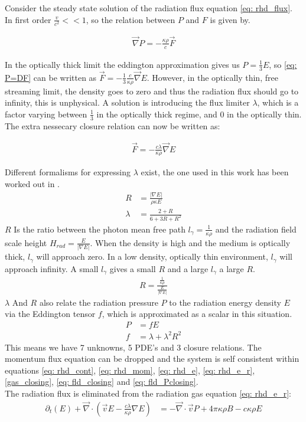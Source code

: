 Consider the steady state solution of the radiation flux equation \eqref{eq: rhd_flux}. In first order $\frac{v}{c^2} << 1$, so the relation between $P$ and $F$ is given by.

\begin{align}
\vec{\nabla} P = - \frac{\kappa \rho}{c} \vec{F} \label{eq: P=DF}
\end{align}

In the optically thick limit the eddington approximation gives us $P = \frac{1}{3}E$, so \eqref{eq: P=DF} can be written as $\vec{F} = -\frac{1}{3}\frac{c}{\kappa \rho} \vec{\nabla}E$. However, in the optically thin, free streaming limit, the density goes to zero and thus the radiation flux should go to infinity, this is unphysical. A solution is introducing the flux limiter $\lambda$, which is a factor varying between $\frac{1}{3}$ in the optically thick regime, and $0$ in the optically thin. The extra nessecary closure relation can now be written as:

\begin{align}
\vec{F} = -\frac{c\lambda}{\kappa \rho} \vec{\nabla}E \label{eq: fld_closing}
\end{align}

Different formalisms for expressing $\lambda$ exist, the one used in this work has been worked out in \cite{Levermore1981}. 
\begin{align}
R &= \frac{|\nabla E|}{\rho \kappa E} \\
\lambda &= \frac{2 + R}{6 + 3R + R^2} 
\end{align}
$R$ Is the ratio between the photon mean free path $l_\gamma = \frac{1}{\kappa \rho}$ and the radiation field scale height $H_{rad} = \frac{E}{\left| \nabla E \right|}$. When the density is high and the medium is optically thick, $l_\gamma$ will approach zero. In a low density, optically thin environment, $l_\gamma$ will approach infinity. A small $l_\gamma$ gives a small $R$ and a large $l_\gamma$ a large $R$.
\begin{align*}
R = \frac{\frac{1}{\kappa \rho}}{\frac{E}{\left| \nabla E \right|}}
\end{align*}
$\lambda$ And $R$ also relate the radiation pressure $P$ to the radiation energy density $E$ via the Eddington tensor $f$, which is approximated as a scalar in this situation.
\begin{align}
P &= f E  \label{eq: fld_Pclosing} \\
f &= \lambda + \lambda^2 R^2
\end{align}
This means we have 7 unknowns, 5 PDE's and 3 closure relations. The momentum flux equation can be dropped and the system is self consistent within equations \eqref{eq: rhd_cont}, \eqref{eq: rhd_mom}, \eqref{eq: rhd_e}, \eqref{eq: rhd_e_r}, \eqref{gas_closing}, \eqref{eq: fld_closing} and \eqref{eq: fld_Pclosing}. \\
The radiation flux is eliminated from the radiation gas equation \ref{eq: rhd_e_r}:
\begin{align}
 \partial_t \left(E \right) +  \vec{\nabla} \cdot \left( \vec{v} E -\frac{c \lambda}{\kappa \rho} \nabla E \right) &=  -\vec{\nabla} \cdot \vec{v} P + 4\pi \kappa\rho B - c \kappa \rho E
\end{align}

